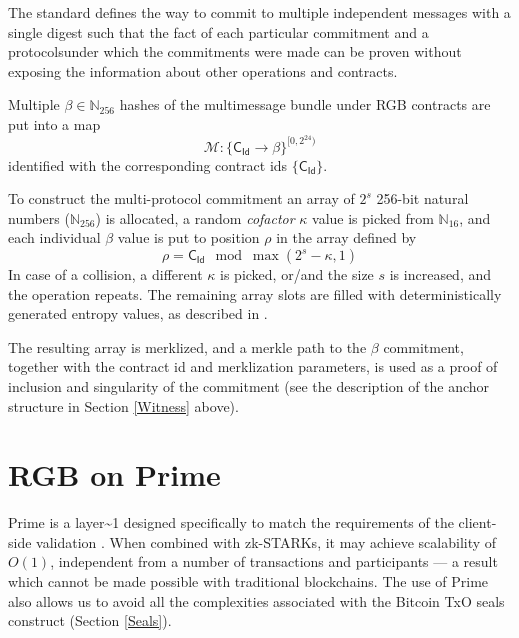 \documentclass[9pt,oneside]{amsart}
\begin{document}
\begin{multicols}{2}
The standard defines the way to commit to multiple independent messages
with a single digest such that the fact of each particular commitment
and a protocols\footnotemark under which the commitments were made can be proven without
exposing the information about other operations and contracts.


Multiple $\beta \in \mathbb{N}_{256}$ hashes of the multimessage bundle under
RGB contracts are put into a map
\noindent
\begin{equation}
\mathcal{M}: \{ \mathsf{C_{Id}} \rightarrow \beta \}^{[0, 2^{24})}
\end{equation}
\noindent
identified with the corresponding contract ids $\{ \mathsf{C_{Id}} \}$.

To construct the multi-protocol commitment an array of $2^s$
256-bit natural numbers ($\mathbb{N}_{256}$) is allocated,
a random \emph{cofactor} $\kappa$ value is picked from $\mathbb{N}_{16}$,
and each individual $\beta$ value is put to position $\rho$ in the array defined by
\noindent
\begin{equation}
    \rho = \mathsf{C_{Id}} \mod \max(2^s - \kappa, 1)
\end{equation}
\noindent
In case of a collision, a different $\kappa$ is picked,
or/and the size $s$ is increased, and the operation repeats.
The remaining array slots are filled with deterministically generated entropy values,
as described in \cite{LNPBP4}.

The resulting array is merklized, and a merkle path to the $\beta$ commitment,
together with the contract id and merklization parameters, is used as a proof of
inclusion and singularity of the commitment
(see the description of the \gls{anchor} structure in Section \ref{Witness} above).


\section{RGB on Prime}\label{Prime}

Prime is a \gls{layer~1} designed specifically to match the requirements of the client-side validation \cite{Prime}.
When combined with zk-STARKs, it may achieve scalability of $O(1)$,
independent from a number of transactions and participants \cite{Prime} —
a result which cannot be made possible with traditional blockchains.
The use of Prime also allows us to avoid all the complexities associated
with the Bitcoin TxO seals construct (Section \ref{Seals}).


\end{multicols}
\end{document}
